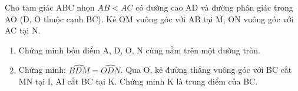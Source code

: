\begin{ex}
Cho tam giác ABC nhọn $AB < AC$ có đường cao AD và đường phân giác trong AO (D, O thuộc cạnh BC). Kẻ OM vuông góc với AB tại M, ON vuông góc với AC tại N.
	\begin{enumerate}
		\item[a)] Chứng minh bốn điểm A, D, O, N cùng nằm trên một đường tròn.
		\item[b)] Chứng minh: $\widehat{BDM} = \widehat{ODN}$. Qua O, kẻ đường thẳng vuông góc với BC cắt MN tại I, AI cắt BC tại K. Chứng minh K là trung điểm của BC.
	\end{enumerate}
\end{ex}
